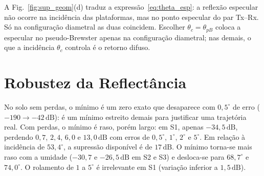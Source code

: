\documentclass[12pt,a4paper,oneside]{book}
\theoremstyle{remark}
\newcommand{\dB}{\,\mathrm{dB}}
\theoremstyle{plain}
\theoremstyle{definition}
\begin{document}
A Fig.~\ref{fig:sup_geom}(d) traduz a expressão~\eqref{eq:theta_esp}: a
reflexão especular não ocorre na incidência das plataformas, mas no ponto
especular do par Tx--Rx. Só na configuração diametral as duas coincidem.
Escolher $\theta_c=\theta_{pB}$ coloca a especular no pseudo-Brewster apenas na
configuração diametral; nas demais, o que a incidência $\theta_c$
controla é o retorno difuso.

\section{Robustez da Reflectância}
\label{sec:sup_enlace}

\begin{table}[H]
\centering\small
\caption{Reflectância TM efetiva [dB] em $\theta_{pB}+\delta$. Rolamento nulo: média
de $\pm\delta$ (simétrica a menos de $1\dB$); rolamento de $5^\circ$: pares
$+\delta/-\delta$. Última coluna: incidência de $53,4^\circ$.}
\label{tab:sup_refl}
\end{table}

No solo sem perdas, o mínimo é um zero exato que desaparece com
$0,5^\circ$ de erro ($-190\to-42\dB$): é um mínimo estreito demais para
justificar uma trajetória real. Com perdas, o mínimo é raso, porém
largo: em S1, apenas $-34,5\dB$, perdendo $0,7$, $2,4$, $6,0$ e $13,0\dB$ com
erros de $0,5^\circ$, $1^\circ$, $2^\circ$ e $5^\circ$. Em relação à incidência de
$53,4^\circ$, a supressão disponível é de $17\dB$. O mínimo torna-se mais raso com a
umidade ($-30,7$ e $-26,5\dB$ em S2 e S3) e desloca-se para $68,7^\circ$ e $74,0^\circ$.
O rolamento de $1$ a $5^\circ$ é irrelevante em S1 (variação inferior a $1,5\dB$).
\end{document}
